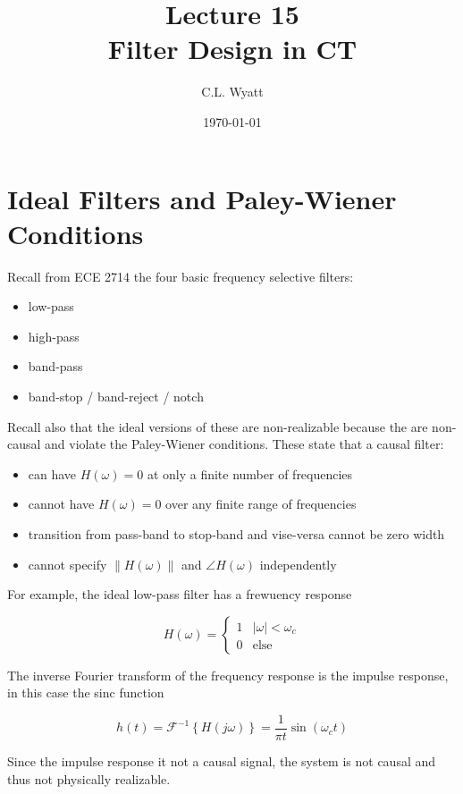 \documentclass{article}
\begin{document}
\title{Lecture 15\\Filter Design in CT}
\author{C.L. Wyatt}
\date{\today}
\maketitle

\section{Ideal Filters and Paley-Wiener Conditions}

Recall from ECE 2714 the four basic frequency selective filters:

\begin{itemize}
\item low-pass
\item high-pass
\item band-pass
\item band-stop / band-reject / notch
\end{itemize}

Recall also that the ideal versions of these are non-realizable because the are non-causal and violate the Paley-Wiener conditions. These state that a causal filter:

\begin{itemize}
\item can have $H(\omega) = 0$ at only a finite number of frequencies
\item cannot have $H(\omega) = 0$ over any finite range of frequencies
\item transition from pass-band to stop-band and vise-versa cannot be zero width
\item cannot specify $\|H(\omega)\|$ and $\angle H(\omega)$ independently
\end{itemize}

For example, the ideal low-pass filter has a frewuency response

\[
H(\omega) = \left\{ \begin{array}{cc}
  1 & |\omega| < \omega_c\\
  0 & \text{else}
\end{array}
\right.
\]

The inverse Fourier transform of the frequency response is the impulse response, in this case the sinc function

\[
h(t) = \mathcal{F}^{-1}\left\{H(j\omega)\right\} = \frac{1}{\pi t}\sin(\omega_c t)
\]

Since the impulse response it not a causal signal, the system is not causal and thus not physically realizable.
\end{document}
